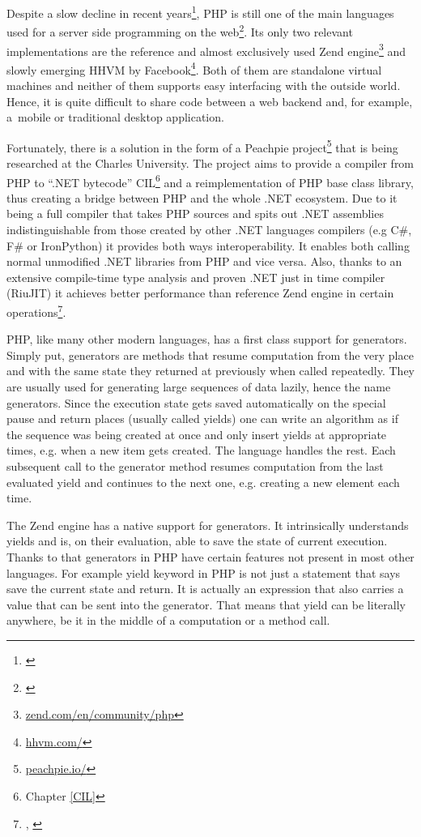 
Despite a slow decline in recent years\footnote{\cite{Tiobe}}, PHP is still one of the main languages used for a server side programming on the web\footnote{\cite{Stack}}. Its only two relevant implementations are the reference and almost exclusively used Zend engine\footnote{\href{http://www.zend.com/en/community/php}{zend.com/en/community/php}} and slowly emerging HHVM by Facebook\footnote{\href{http://hhvm.com/}{hhvm.com/}}. Both of them are standalone virtual machines and neither of them supports easy interfacing with the outside world. Hence, it is quite difficult to share code between a web backend and, for example, a~mobile or traditional desktop application.

Fortunately, there is a solution in the form of a Peachpie project\footnote{\href{http://www.peachpie.io/}{peachpie.io/}} that is being researched at the Charles University. The project aims to provide a compiler from PHP to “.NET bytecode” CIL\footnote{Chapter \ref{CIL}} and a reimplementation of PHP base class library, thus creating a bridge between PHP and the whole .NET ecosystem. Due to it being a full compiler that takes PHP sources and spits out .NET assemblies indistinguishable from those created by other .NET languages compilers (e.g C\#, F\# or IronPython) it provides both ways interoperability. It enables both calling normal unmodified .NET libraries from PHP and vice versa. Also, thanks to an extensive compile-time type analysis and proven .NET just in time compiler (RiuJIT) it achieves better performance than reference Zend engine in certain operations\footnote{\cite{PchpBenchBlog}, \cite{PchpBenchSite}}.

PHP, like many other modern languages, has a first class support for generators. Simply put, generators are methods that resume computation from the very place and with the same state they returned at previously when called repeatedly. They are usually used for generating large sequences of data lazily, hence the name generators. Since the execution state gets saved automatically on the special pause and return places (usually called yields) one can write an algorithm as if the sequence was being created at once and only insert yields at appropriate times, e.g. when a new item gets created. The language handles the rest. Each subsequent call to the generator method resumes computation from the last evaluated yield and continues to the next one, e.g. creating a new element each time. 

The Zend engine has a native support for generators. It intrinsically understands yields and is, on their evaluation, able to save the state of current execution. Thanks to that generators in PHP have certain features not present in most other languages. For example yield keyword in PHP is not just a statement that says save the current state and return. It is actually an expression that also carries a value that can be sent into the generator. That means that yield can be literally anywhere, be it in the middle of a computation or a method call.

